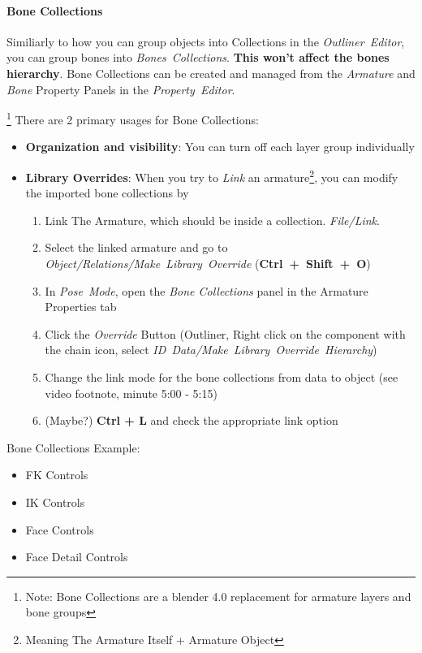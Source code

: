 \documentclass{article}
\begin{document}
\paragraph{Bone Collections}
Similiarly to how you can group objects into Collections in the \mbox{\textit{Outliner Editor}}, you can group bones into \mbox{\textit{Bones Collections}}. \textbf{This won't affect the bones hierarchy}.
Bone Collections can be created and managed from the \textit{Armature} and \textit{Bone} Property Panels in the \mbox{\textit{Property Editor}}.\par\footnote{Note: Bone Collections are a blender 4.0 
replacement for armature layers and bone groups}
There are 2 primary usages for Bone Collections:
\begin{itemize}[noitemsep, topsep=0pt]
    \item \textbf{Organization and visibility}: You can turn off each layer group individually
    \item \textbf{Library Overrides}\footnotemark: When you try to \textit{Link} an armature\footnote{Meaning The Armature Itself + Armature Object}, you can modify the imported bone collections by
    \begin{enumerate}[noitemsep, topsep=0pt]
        \item Link The Armature, which should be inside a collection. \mbox{\textit{File/Link}}.
        \item Select the linked armature and go to \mbox{\textit{Object/Relations/Make Library Override}} (\mbox{\textbf{Ctrl + Shift + O}})
        \item In \mbox{\textit{Pose Mode}}, open the \textit{Bone Collections} panel in the Armature Properties tab
        \item Click the \textit{Override} Button (Outliner, Right click on the component with the chain icon, select \mbox{\textit{ID Data/Make Library Override Hierarchy}})
        \item Change the link mode for the bone collections from data to object (see video footnote, minute 5:00 - 5:15)
        \item (Maybe?) \textbf{Ctrl + L} and check the appropriate link option
    \end{enumerate}
\end{itemize}
Bone Collections Example:
\begin{itemize}[noitemsep, topsep=0pt]
    \item FK Controls
    \item IK Controls
    \item Face Controls
    \item Face Detail Controls
\end{itemize}
\end{document}
